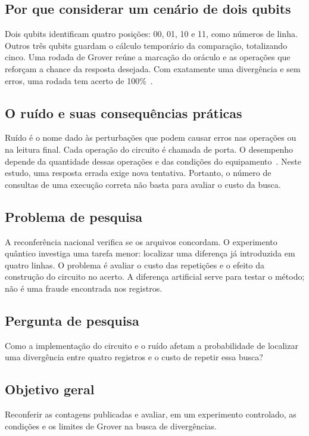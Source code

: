 \documentclass[conference]{IEEEtran}
\begin{document}
\subsection{Por que considerar um cenário de dois qubits}
Dois qubits identificam quatro posições: 00, 01, 10 e 11, como números de linha. Outros três qubits guardam o cálculo temporário da comparação, totalizando cinco. Uma rodada de Grover reúne a marcação do oráculo e as operações que reforçam a chance da resposta desejada. Com exatamente uma divergência e sem erros, uma rodada tem acerto de 100\%~\cite{boyer1998}.

\subsection{O ruído e suas consequências práticas}
Ruído é o nome dado às perturbações que podem causar erros nas operações ou na leitura final. Cada operação do circuito é chamada de porta. O desempenho depende da quantidade dessas operações e das condições do equipamento~\cite{pokharel2024,abughanem2025}. Neste estudo, uma resposta errada exige nova tentativa. Portanto, o número de consultas de uma execução correta não basta para avaliar o custo da busca.

\subsection{Problema de pesquisa}
A reconferência nacional verifica se os arquivos concordam. O experimento quântico investiga uma tarefa menor: localizar uma diferença já introduzida em quatro linhas. O problema é avaliar o custo das repetições e o efeito da construção do circuito no acerto. A diferença artificial serve para testar o método; não é uma fraude encontrada nos registros.

\subsection{Pergunta de pesquisa}
Como a implementação do circuito e o ruído afetam a probabilidade de localizar uma divergência entre quatro registros e o custo de repetir essa busca?

\subsection{Objetivo geral}
Reconferir as contagens publicadas e avaliar, em um experimento controlado, as condições e os limites de Grover na busca de divergências.
\end{document}
